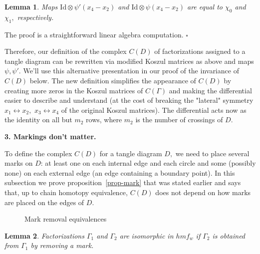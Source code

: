 \documentclass[12pt]{article}
\newtheorem{lemma}{Lemma}
\begin{document}
\begin{lemma} Maps $\mathrm{Id}\otimes \psi'(x_4-x_2)$ and 
 $ \mathrm{Id}\otimes \psi(x_4-x_2)$ are equal to $\chi_0$ and $\chi_1,$ 
 respectively. 
\end{lemma} 
The proof is a straightforward linear algebra computation. 
$\square$ 

\vspace{0.1in} 

Therefore, our definition of the complex $C(D)$ of factorizations 
assigned to a tangle diagram can be rewritten via modified Koszul 
matrices as above and maps $\psi, \psi'.$ We'll use this alternative 
presentation in our proof of the invariance of $C(D)$ below. 
The new definition simplifies the appearance of $C(D)$ by creating 
more zeros in the Koszul matrices of $C(\Gamma)$ and making the
differential easier to describe and understand (at the cost of 
breaking the "lateral" symmetry $x_1\leftrightarrow x_2,$ 
$x_3 \leftrightarrow x_4$ of the original Koszul matrices). 
The differential acts now as the identity on all but $m_2$ rows, 
where $m_2$ is the number of crossings of $D.$  

\vspace{0.1in} 


{\bf 3. Markings don't matter.} 

\vspace{0.1in} 

To define the complex $C(D)$ for a tangle diagram $D,$ we need to 
place several marks on $D$: at least one on each internal edge and 
each circle and some (possibly none) on each external edge (an edge 
containing a boundary point). In this subsection we prove 
proposition~\ref{prop-mark} that was stated earlier and says that, 
up to chain homotopy equivalence, $C(D)$ does not depend on how 
marks are placed on the edges of $D.$ 

\begin{figure}  \caption{Mark removal equivalences} 
\label{rmarks1}
 \end{figure}

\begin{lemma} Factorizations $\Gamma_1$ and $\Gamma_2$ 
are isomorphic in $hmf_w$ if $\Gamma_2$ is obtained from $\Gamma_1$ 
by removing a mark. 
\end{lemma} 
\end{document}
